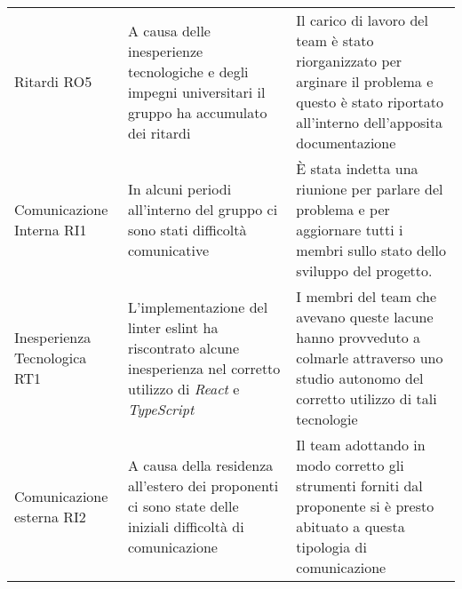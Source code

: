 \begin{center}
\begin{table}[h!]
\begin{tabular}{p{90px} p{160px} p{160px}}
            Ritardi RO5                           & A causa delle inesperienze tecnologiche e degli impegni universitari il gruppo ha accumulato dei ritardi                                                                                                                                                                                     & Il carico di lavoro del team è stato riorganizzato per arginare il problema e questo è stato riportato all'interno dell'apposita documentazione                                                \\
            Comunicazione \newline Interna RI1    & In alcuni periodi all'interno del gruppo ci sono stati difficoltà comunicative                                                                                                                                                                                                               & È stata indetta una riunione per parlare del problema e per aggiornare tutti i membri sullo stato dello sviluppo del progetto.                                                                 \\
            Inesperienza \newline Tecnologica RT1 & L'implementazione del linter eslint ha riscontrato alcune inesperienza nel corretto utilizzo di \textit{React} e \newline \textit{TypeScript}                                                                                                                                                & I membri del team che avevano queste lacune hanno provveduto a colmarle attraverso uno studio autonomo del corretto utilizzo di tali tecnologie                                                \\
            Comunicazione \newline esterna RI2    & A causa della residenza all'estero dei proponenti ci sono state delle iniziali difficoltà di comunicazione                                                                                                                                                                                   & Il team adottando in modo corretto gli strumenti forniti dal proponente si è presto abituato a questa tipologia di comunicazione
        \end{tabular}
    \end{table}
\end{center}
